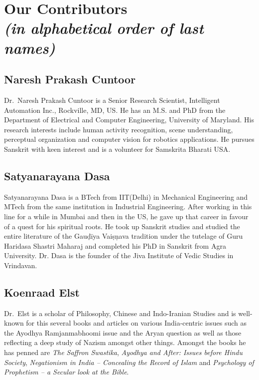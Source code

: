 \makeatletter
\def\@makeschapterhead#1{%
  \vspace*{50\p@}%
  {\parindent \z@ \raggedright
    \normalfont
    \interlinepenalty\@M
    \LARGE \bfseries  #1\par\nobreak
    \vskip 20\p@
  }}
\makeatother

\chapter*{Our Contributors\\ {\rm\sl\small (in alphabetical order of last names)}}\label{contributors}

\lhead[\small\thepage]{}
\rhead[]{\small\thepage}
\chead[]{}
\cfoot[]{}

\section*{Naresh Prakash Cuntoor}

Dr.~Naresh Prakash Cuntoor is a Senior Research Scientist, Intelligent Automation Inc., Rockville, MD, US. He has an M.S. and PhD from the Department of Electrical and Computer Engineering, University of Maryland. His research interests include human activity recognition, scene understanding, perceptual organization and computer vision for robotics applications. He pursues Sanskrit with keen interest and is a volunteer for Samskrita Bharati USA.

\section*{Satyanarayana Dasa}

Satyanarayana Dasa is a BTech from IIT(Delhi) in Mechanical Engineering and MTech from the same institution in Industrial Engineering. After working in this line for a while in Mumbai and then in the US, he gave up that career in favour of a quest for his spiritual roots. He took up Sanskrit studies and studied the entire literature of the Gauḍīya Vaiṣṇava tradition under the tutelage of Guru Haridasa Shastri Maharaj and completed his PhD in Sanskrit from Agra University. Dr. Dasa is the founder of the Jiva Institute of Vedic Studies in Vrindavan.

\section*{Koenraad Elst}

Dr.~Elst is a scholar of Philosophy, Chinese and Indo-Iranian Studies and is well-known for this several books and articles on various India-centric issues such as the Ayodhya Ramjanmabhoomi issue and the Aryan question as well as those reflecting a deep study of Nazism amongst other things. Amongst the books he has penned are {\sl The Saffron Swastika}, {\sl Ayodhya and After: Issues before Hindu Society}, {\sl Negationism in India – Concealing the Record of Islam} and {\sl Psychology of Prophetism – a Secular look at the Bible}. 

